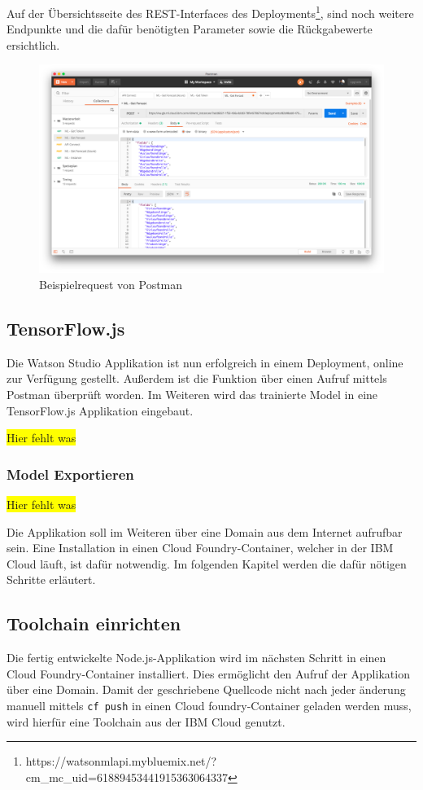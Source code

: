 Auf der Übersichtsseite des REST-Interfaces des
Deployments\footnote{https://watson\-ml\-api.mybluemix.net/?cm\_mc\_uid=61889453441915363064337}, sind noch weitere
Endpunkte und die dafür benötigten Parameter sowie die Rückgabewerte ersichtlich.

\begin{figure}[h]
    \centering
    \includegraphics[scale=0.26]{images/kapitel_3/deployment_postman.png}
    \caption{Beispielrequest von Postman}
    \label{fig:umsetzung_deployment_postman}
\end{figure}

\subsection{TensorFlow.js}
Die Watson Studio Applikation ist nun erfolgreich in einem Deployment, online zur Verfügung gestellt. Außerdem ist die
Funktion über einen Aufruf mittels Postman überprüft worden. Im Weiteren wird das trainierte Model in eine TensorFlow.js
Applikation eingebaut.

\colorbox{yellow}{Hier fehlt was}

\subsubsection{Model Exportieren}
\colorbox{yellow}{Hier fehlt was}

Die Applikation soll im Weiteren über eine Domain aus dem Internet aufrufbar sein. Eine Installation in einen Cloud
Foundry-Container, welcher in der IBM Cloud läuft, ist dafür notwendig. Im folgenden Kapitel werden die dafür nötigen
Schritte erläutert.

\subsection{Toolchain einrichten}
Die fertig entwickelte Node.js-Applikation wird im nächsten Schritt in einen Cloud Foundry-Container installiert. Dies
ermöglicht den Aufruf der Applikation über eine Domain. Damit der geschriebene Quellcode nicht nach jeder änderung manuell
mittels \texttt{cf push} in einen Cloud foundry-Container geladen werden muss, wird hierfür eine Toolchain aus der
IBM Cloud genutzt.

